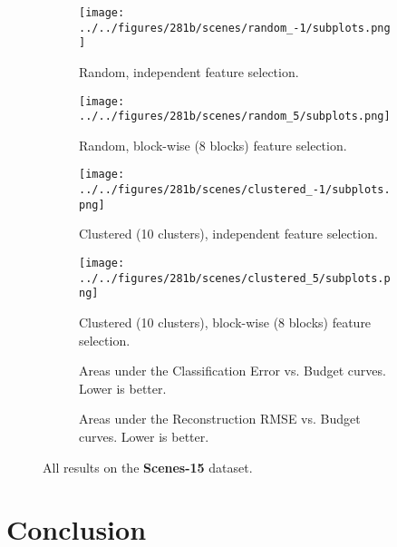 \begin{figure}[ht!]
    \centering
    \begin{subfigure}[b]{\textwidth}
        \centering
        \texttt{[image: ../../figures/281b/scenes/random\_-1/subplots.png]}
        \caption{Random, independent feature selection.\vspace{.2cm}}
    \end{subfigure}
    \begin{subfigure}[b]{\textwidth}
        \centering
        \texttt{[image: ../../figures/281b/scenes/random\_5/subplots.png]}
        \caption{Random, block-wise (8 blocks) feature selection.\vspace{.2cm}}
    \end{subfigure}
    \begin{subfigure}[b]{\textwidth}
        \centering
        \texttt{[image: ../../figures/281b/scenes/clustered\_-1/subplots.png]}
        \caption{Clustered (10 clusters), independent feature selection.\vspace{.2cm}}
    \end{subfigure}
    \begin{subfigure}[b]{\textwidth}
        \centering
        \texttt{[image: ../../figures/281b/scenes/clustered\_5/subplots.png]}
        \caption{Clustered (10 clusters), block-wise (8 blocks) feature selection.\vspace{.2cm}}
    \end{subfigure}

    \small{
    \begin{subfigure}[b]{1\textwidth}
        \centering
        
        \caption{Areas under the Classification Error vs. Budget curves. Lower is better.}
    \end{subfigure}
    \begin{subfigure}[b]{1\textwidth}
        \centering
        
        \caption{Areas under the Reconstruction RMSE vs. Budget curves. Lower is better.}
    \end{subfigure}
    }
    \caption{All results on the \textbf{Scenes-15} dataset.}
    \label{fig:scenes}
\end{figure}

\section{Conclusion}

